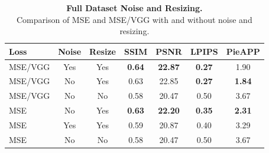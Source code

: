 \begin{table}
    \centering
    \captionsetup{justification=centering}
    \caption{\textbf{Full Dataset Noise and Resizing.} \\ Comparison of MSE and MSE/VGG with and without noise and resizing.}
    \setlength{\tabcolsep}{0.3em}
    \begin{tabular}{lcccccc}
        \toprule
        Loss & Noise & Resize & SSIM & PSNR & LPIPS & PieAPP \\
        \midrule
        MSE/VGG & Yes & Yes & \textbf{0.64} & \textbf{22.87} & \textbf{0.27} & 1.90 \\
        MSE/VGG & No & Yes & 0.63 & 22.85 & \textbf{0.27} & \textbf{1.84} \\
        MSE/VGG & No & No & 0.58 & 20.47 & 0.50 & 3.67 \\
        \midrule
        MSE & No & Yes & \textbf{0.63} & \textbf{22.20} & \textbf{0.35} & \textbf{2.31} \\
        MSE & Yes & Yes & 0.59 & 20.87 & 0.40 & 3.29 \\
        MSE & No & No & 0.58 & 20.47 & 0.50 & 3.67 \\
        \bottomrule
    \end{tabular}
    \label{tab:full-data-resize-noise}
\end{table}

